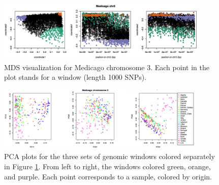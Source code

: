 \documentclass[11pt, oneside]{article}   	%
\begin{document}
\begin{figure}
    \begin{center}
       \includegraphics[width=0.9\textwidth]{medicago_mds}
    \end{center}
    \caption{
     MDS visualization for Medicago chromosome 3. Each point in the plot stands for a window (length 1000 SNPs).
       \label{fig:mds12_medicago}
    }
\end{figure}

\begin{figure}
    \begin{center}
       \includegraphics[width=0.9\textwidth]{medicago_peaks_pca}
    \end{center}
    \caption{
        PCA plots for the three sets of genomic windows colored separately in Figure \ref{fig:mds12_medicago}. 
        From left to right, the windows colored green, orange, and purple. Each point corresponds to a sample, colored by origin.
        \label{fig:pca_medicago}
    }
\end{figure}
\end{document}
